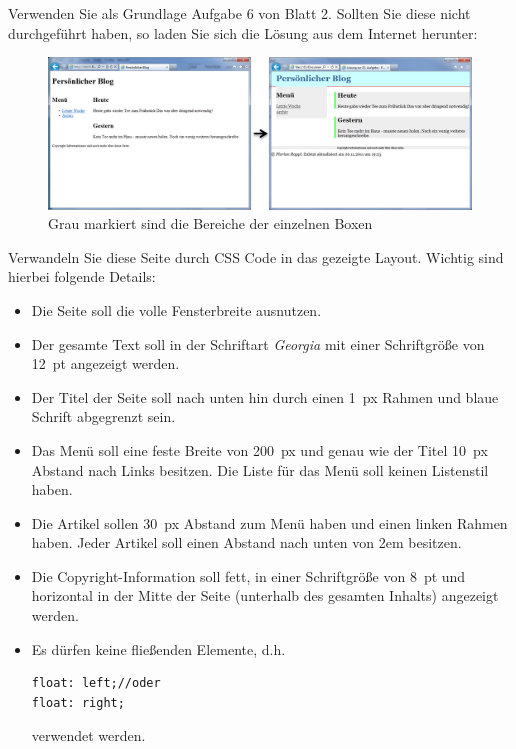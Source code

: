%
\par Verwenden Sie als Grundlage Aufgabe 6 von Blatt 2. Sollten Sie diese nicht
durchgeführt haben, so laden Sie sich die Lösung aus dem Internet herunter:
%
\begin{figure}[!h]
\centering
\includegraphics[width=1\textwidth]{Exercises/Figures/applycss.png}
\caption{Grau markiert sind die Bereiche der einzelnen Boxen}
\label{fig:applycss}
\end{figure}
%
\par Verwandeln Sie diese Seite durch CSS Code in das gezeigte Layout. Wichtig
sind hierbei folgende Details:
%
\begin{itemize}
\item
Die Seite soll die volle Fensterbreite ausnutzen.
\item
Der gesamte Text soll in der Schriftart \emph{Georgia} mit einer Schriftgröße
von \qty{12}{pt} angezeigt werden.
\item
Der Titel der Seite soll nach unten hin durch einen \qty{1}{px} Rahmen und
blaue Schrift abgegrenzt sein.
\item
Das Menü soll eine feste Breite von \qty{200}{px} und genau wie der Titel
\qty{10}{px} Abstand nach Links besitzen. Die Liste für das Menü soll keinen
Listenstil haben.
\item
Die Artikel sollen \qty{30}{px} Abstand zum Menü haben und einen linken Rahmen
haben. Jeder Artikel soll einen Abstand nach unten von 2em besitzen.
\item
Die Copyright-Information soll fett, in einer Schriftgröße von \qty{8}{pt} und
horizontal in der Mitte der Seite (unterhalb des gesamten Inhalts) angezeigt
werden. 
\item
Es dürfen keine fließenden Elemente, d.h.
%
\begin{lstlisting}
float: left;//oder
float: right;
\end{lstlisting}
%
verwendet werden.
\end{itemize}